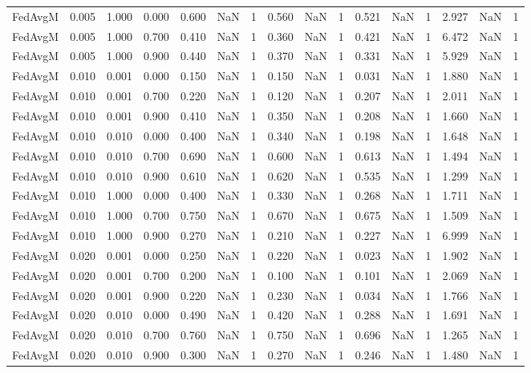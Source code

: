 \begin{table}[htbp]
\begin{tabular}{lccccccccccccccc}
FedAvgM & 0.005 & 1.000 & 0.000 & 0.600 & NaN & 1 & 0.560 & NaN & 1 & 0.521 & NaN & 1 & 2.927 & NaN & 1 \\
FedAvgM & 0.005 & 1.000 & 0.700 & 0.410 & NaN & 1 & 0.360 & NaN & 1 & 0.421 & NaN & 1 & 6.472 & NaN & 1 \\
FedAvgM & 0.005 & 1.000 & 0.900 & 0.440 & NaN & 1 & 0.370 & NaN & 1 & 0.331 & NaN & 1 & 5.929 & NaN & 1 \\
FedAvgM & 0.010 & 0.001 & 0.000 & 0.150 & NaN & 1 & 0.150 & NaN & 1 & 0.031 & NaN & 1 & 1.880 & NaN & 1 \\
FedAvgM & 0.010 & 0.001 & 0.700 & 0.220 & NaN & 1 & 0.120 & NaN & 1 & 0.207 & NaN & 1 & 2.011 & NaN & 1 \\
FedAvgM & 0.010 & 0.001 & 0.900 & 0.410 & NaN & 1 & 0.350 & NaN & 1 & 0.208 & NaN & 1 & 1.660 & NaN & 1 \\
FedAvgM & 0.010 & 0.010 & 0.000 & 0.400 & NaN & 1 & 0.340 & NaN & 1 & 0.198 & NaN & 1 & 1.648 & NaN & 1 \\
FedAvgM & 0.010 & 0.010 & 0.700 & 0.690 & NaN & 1 & 0.600 & NaN & 1 & 0.613 & NaN & 1 & 1.494 & NaN & 1 \\
FedAvgM & 0.010 & 0.010 & 0.900 & 0.610 & NaN & 1 & 0.620 & NaN & 1 & 0.535 & NaN & 1 & 1.299 & NaN & 1 \\
FedAvgM & 0.010 & 1.000 & 0.000 & 0.400 & NaN & 1 & 0.330 & NaN & 1 & 0.268 & NaN & 1 & 1.711 & NaN & 1 \\
FedAvgM & 0.010 & 1.000 & 0.700 & 0.750 & NaN & 1 & 0.670 & NaN & 1 & 0.675 & NaN & 1 & 1.509 & NaN & 1 \\
FedAvgM & 0.010 & 1.000 & 0.900 & 0.270 & NaN & 1 & 0.210 & NaN & 1 & 0.227 & NaN & 1 & 6.999 & NaN & 1 \\
FedAvgM & 0.020 & 0.001 & 0.000 & 0.250 & NaN & 1 & 0.220 & NaN & 1 & 0.023 & NaN & 1 & 1.902 & NaN & 1 \\
FedAvgM & 0.020 & 0.001 & 0.700 & 0.200 & NaN & 1 & 0.100 & NaN & 1 & 0.101 & NaN & 1 & 2.069 & NaN & 1 \\
FedAvgM & 0.020 & 0.001 & 0.900 & 0.220 & NaN & 1 & 0.230 & NaN & 1 & 0.034 & NaN & 1 & 1.766 & NaN & 1 \\
FedAvgM & 0.020 & 0.010 & 0.000 & 0.490 & NaN & 1 & 0.420 & NaN & 1 & 0.288 & NaN & 1 & 1.691 & NaN & 1 \\
FedAvgM & 0.020 & 0.010 & 0.700 & 0.760 & NaN & 1 & 0.750 & NaN & 1 & 0.696 & NaN & 1 & 1.265 & NaN & 1 \\
FedAvgM & 0.020 & 0.010 & 0.900 & 0.300 & NaN & 1 & 0.270 & NaN & 1 & 0.246 & NaN & 1 & 1.480 & NaN & 1 \\

\end{tabular}
\end{table}
